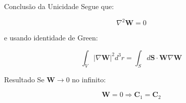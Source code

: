 \documentclass[aspectratio=169]{beamer}
\begin{document}
\begin{frame}{Conclusão da Unicidade}
Segue que:

\begin{equation}
\nabla^2 \mathbf{W} = 0
\end{equation}

e usando identidade de Green:

\begin{equation}
\int_V |\nabla \mathbf{W}|^2 d^3 r =
\int_S d\mathbf{S} \cdot \mathbf{W} \nabla \mathbf{W}
\end{equation}

\begin{block}{Resultado}
Se $\mathbf{W} \to 0$ no infinito:

\begin{equation}
\mathbf{W} = 0 \Rightarrow \mathbf{C}_1 = \mathbf{C}_2
\end{equation}
\end{block}
\end{frame}
\end{document}
